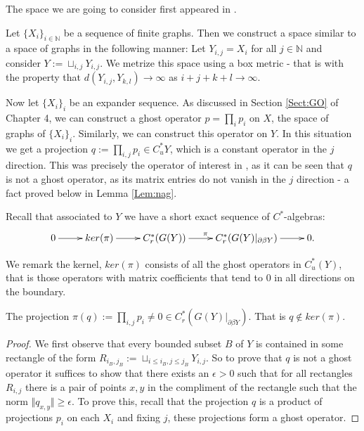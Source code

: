 \begin{example}
The space we are going to consider first appeared in \cite{MR2363697}.

Let $\lbrace X_{i} \rbrace_{i \in \mathbb{N}}$ be a sequence of finite graphs. Then we construct a space similar to a space of graphs in the following manner: Let $Y_{i,j} = X_{i}$ for all $j \in \mathbb{N}$ and consider $Y:= \sqcup_{i,j} Y_{i,j}$. We metrize this space using a box metric - that is with the property that $d(Y_{i,j},Y_{k,l}) \rightarrow \infty$ as $i+j+k+l \rightarrow \infty$. 

Now let $\lbrace X_{i} \rbrace_{i}$ be an expander sequence. As discussed in Section \ref{Sect:GO} of Chapter 4, we can construct a ghost operator $p= \prod_{i} p_{i}$ on $X$, the space of graphs of $\lbrace X_{i} \rbrace_{i}$. Similarly, we can construct this operator on $Y$. In this situation we get a projection $q:=\prod_{i,j}p_{i} \in C^{*}_{u}Y$, which is a constant operator in the $j$ direction. This was precisely the operator of interest in \cite{MR2363697}, as it can be seen that $q$ is not a ghost operator, as its matrix entries do not vanish in the $j$ direction - a fact proved below in Lemma \ref{Lem:nag}.

Recall that associated to $Y$ we have a short exact sequence of $C^{*}$-algebras:
\begin{equation*}
\xymatrix{
0 \ar[r] & ker(\pi) \ar[r]& C_{r}^{*}(G(Y)) \ar[r]^{\pi} & C_{r}^{*}(G(Y)|_{\partial\beta Y}) \ar[r] & 0.
}
\end{equation*}

We remark the kernel, $ker(\pi)$ consists of all the ghost operators in $C^{*}_{u}(Y)$, that is those operators with matrix coefficients that tend to $0$ in all directions on the boundary. 

\begin{lemma}\label{Lem:nag}
The projection $\pi(q):= \prod_{i,j}p_{i} \not = 0 \in C^{*}_{r}(G(Y)|_{\partial\beta Y})$. That is $q \not\in ker(\pi)$.
\end{lemma}
\begin{proof}
We first observe that every bounded subset $B$ of $Y$ is contained in some rectangle of the form $R_{i_{B},j_{B}}:=\sqcup_{i\leq i_{B},j\leq j_{B}}Y_{i,j}$. So to prove that $q$ is not a ghost operator it suffices to show that there exists an $\epsilon>0$ such that for all rectangles $R_{i,j}$ there is a pair of points $x,y$ in the compliment of the rectangle such that  the norm $\Vert q_{x,y} \Vert \geq \epsilon$. To prove this, recall that the projection $q$ is a product of projections $p_{i}$ on each $X_{i}$ and fixing $j$, these projections form a ghost operator. 


\end{proof}
\end{example}
